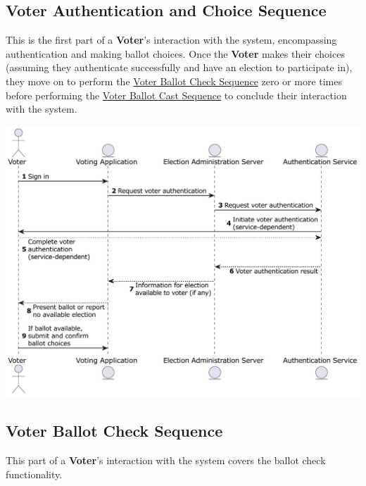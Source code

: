 \documentclass[10pt,letterpaper]{article}
\begin{document}
\pagebreak
\subsection{Voter Authentication and Choice Sequence}

This is the first part of a \textbf{Voter}'s interaction with the system, encompassing authentication and making ballot choices. Once the \textbf{Voter} makes their choices (assuming they authenticate successfully and have an election to participate in), they move on to perform the \hyperlink{voter-ballot-check-sequence}{Voter Ballot Check Sequence} zero or more times before performing the \hyperlink{voter-ballot-cast-sequence}{Voter Ballot Cast Sequence} to conclude their interaction with the system.

\includegraphics[width=\textwidth]{diagrams/seq-voter-auth-choice.pdf}

\pagebreak
\subsection{Voter Ballot Check Sequence}
\hypertarget{voter-ballot-check-sequence}{}

This part of a \textbf{Voter}'s interaction with the system covers the ballot check functionality.
\end{document}
